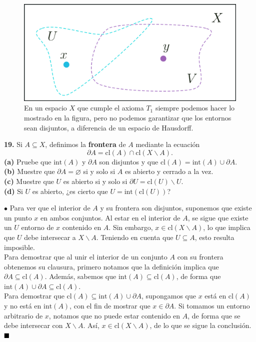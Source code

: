 \documentclass{article}
\begin{document}
\begin{figure}[h]
	\centering \includegraphics[scale=0.15]{e2fig.png}
	\caption{En un espacio $X$ que cumple el axioma $T_{1}$ siempre podemos hacer lo mostrado en la figura, pero no podemos garantizar que los entornos sean disjuntos, a diferencia de un espacio de Hausdorff. }
\end{figure}
\newpage
\begin{mybox}
	\textbf{19. } Si $A \subseteq X$, definimos la \textbf{frontera} de $A$ mediante la ecuación
	$$ \partial A = \text{cl}(A) \cap \text{cl}(X \backslash A). $$
	\textbf{(a)} Pruebe que $\text{int}(A)$ y $\partial A$ son disjuntos y que $\text{cl}(A) = \text{int}(A) \cup \partial A$. \\
	
	\textbf{(b)} Muestre que $\partial A = \varnothing $ si y solo si $A$ es abierto y cerrado a la vez. \\
	
	\textbf{(c)} Muestre que $U$ es abierto si y solo si $\partial U = \text{cl}(U) \backslash U$.\\
	
	\textbf{(d)} Si $U$ es abierto, ¿es cierto que $U = \text{int}(\text{cl}(U))$?
\end{mybox}	
$\bullet$ Para ver que el interior de $A$ y su frontera son disjuntos, suponemos que existe un punto $x$ en ambos conjuntos. Al estar en el interior de $A$, se sigue que existe un $U$ entorno de $x$ contenido en $A$. Sin embargo, $x \in \text{cl}(X \backslash A)$, lo que implica que $U$ debe intersecar a $X \backslash A$. Teniendo en cuenta que $U \subseteq A$, esto resulta imposible. \\

Para demostrar que al unir el interior de un conjunto $A$ con su frontera obtenemos su clausura, primero notamos que la definición implica que $\partial A \subseteq \text{cl}(A)$. Además, sabemos que $\text{int}(A) \subseteq \text{cl}(A)$, de forma que $\text{int}(A) \cup \partial A \subseteq \text{cl}(A)$.\\
Para demostrar que $\text{cl}(A) \subseteq \text{int}(A) \cup \partial A$, supongamos que $x$ está en $\text{cl}(A)$ y no está en $\text{int}(A)$, con el fin de mostrar que $x \in \partial A$. Si tomamos un entorno arbitrario de $x$, notamos que no puede estar contenido en $A$, de forma que se debe intersecar con $X \backslash A$. Así, $x \in \text{cl}(X \backslash A)$, de lo que se sigue la conclusión. $\hspace*{\fill} \blacksquare$ \\
\end{document}

